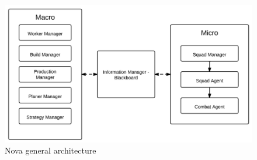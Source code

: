 
\begin{figure}[h!tbp]
\centering
\includegraphics[scale=0.8]{graphics/nova.png}
\caption{Nova general architecture}
\label{fig:novaarch}
\end{figure}

